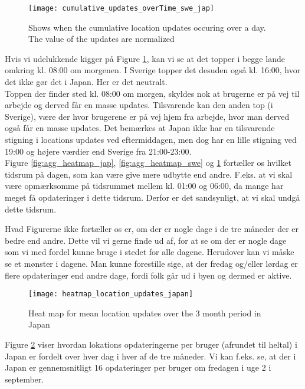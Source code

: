 \begin{figure}[H]
    \hspace*{-1.8cm}
    \centering
    \texttt{[image: cumulative\_updates\_overTime\_swe\_jap]}
    \caption{Shows when the cumulative location updates occuring over a day. The value of the updates are normalized}
    \label{fig:cumu_loc_time_jap_swe}
\end{figure}

Hvis vi udelukkende kigger på Figure \ref{fig:cumu_loc_time_jap_swe}, kan vi se at det topper i begge lande omkring kl. 08:00 om morgenen. I Sverige topper det desuden også kl. 16:00, hvor det ikke gør det i Japan. Her er det neutralt. \\
Toppen der finder sted kl. 08:00 om morgen, skyldes nok at brugerne er på vej til arbejde og derved får en masse updates. Tilsvarende kan den anden top (i Sverige), være der hvor brugerene er på vej hjem fra arbejde, hvor man derved også får en masse updates. Det bemærkes at Japan ikke har en tilsvarende stigning i locations updates ved eftermiddagen, men dog har en lille stigning ved 19:00 og højere værdier end Sverige fra 21:00-23:00.\\

Figure \ref{fig:agg_heatmap_jap}, \ref{fig:agg_heatmap_swe} og \ref{fig:cumu_loc_time_jap_swe} fortæller os hvilket tidsrum på dagen, som kan være give mere udbytte end andre. F.eks. at vi skal være opmærksomme på tidsrummet mellem kl. 01:00 og 06:00, da mange har meget få opdateringer i dette tidsrum. Derfor er det sandsynligt, at vi skal undgå dette tidsrum. 

Hvad Figurerne ikke fortæller os er, om der er nogle dage i de tre måneder der er bedre end andre. Dette vil vi gerne finde ud af, for at se om der er nogle dage som vi med fordel kunne bruge i stedet for alle dagene. Herudover kan vi måske se et mønster i dagene. Man kunne forestille sige, at der fredag og/eller lørdag er flere opdateringer end andre dage, fordi folk går ud i byen og dermed er aktive. 


\begin{figure}[H]
    \hspace*{-1.5cm}
    \centering
    \texttt{[image: heatmap\_location\_updates\_japan]}
    \caption{Heat map for mean location updates over the 3 month period in Japan}
    \label{fig:heatmap_jap}
\end{figure}

Figure \ref{fig:heatmap_jap} viser hvordan lokations opdateringerne per bruger (afrundet til heltal) i Japan er fordelt over hver dag i hver af de tre måneder. Vi kan f.eks. se, at der i Japan er gennemsnitligt 16 opdateringer per bruger om fredagen i uge 2 i september. 

